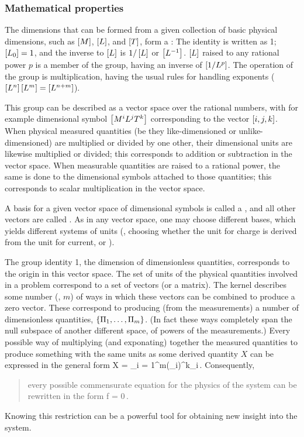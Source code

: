 \subsubsection{Mathematical properties}
The dimensions that can be formed from a given collection of basic physical dimensions, such as $\left[{M}\right]$, $\left[{L}\right]$, and $\left[{T}\right]$, form a : The identity is written as 1; $\left[{L_0}\right] = 1$, and the inverse to $\left[{L}\right]$ is $1/\left[{L}\right]$ or $\left[{L^{-1}}\right]$. $\left[{L}\right]$ raised to any rational power $p$ is a member of the group, having an inverse of $\left[{1/L^p}\right]$. The operation of the group is multiplication, having the usual rules for handling exponents ($\left[{L^n}\right]\left[{L^m}\right] = \left[{L^{n+m}}\right]$).

This group can be described as a vector space over the rational numbers, with for example dimensional symbol $\left[{M^iL^jT^k}\right]$ corresponding to the vector $\left[{i,j,k}\right]$. When physical measured quantities (be they like-dimensioned or unlike-dimensioned) are multiplied or divided by one other, their dimensional units are likewise multiplied or divided; this corresponds to addition or subtraction in the vector space. When measurable quantities are raised to a rational power, the same is done to the dimensional symbols attached to those quantities; this corresponds to scalar multiplication in the vector space.

A basis for a given vector space of dimensional symbols is called a , and all other vectors are called . As in any vector space, one may choose different bases, which yields different systems of units (\eg, choosing whether the unit for charge is derived from the unit for current, or \vis).

The group identity 1, the dimension of dimensionless quantities, corresponds to the origin in this vector space.
The set of units of the physical quantities involved in a problem correspond to a set of vectors (or a matrix). The kernel describes some number (\eg, $m$) of ways in which these vectors can be combined to produce a zero vector. These correspond to producing (from the measurements) a number of dimensionless quantities, $\left\lbrace{\Pi_1,\dotsc,\Pi_m}\right\rbrace$. (In fact these ways completely span the null subspace of another different space, of powers of the measurements.) Every possible way of multiplying (and exponating) together the measured quantities to produce something with the same units as some derived quantity $X$ can be expressed in the general form 
\beq
X = \prod_{i = 1}^{m}\left(\kdim_i\right)^{k_i}\,.
\eeq
Consequently, 
\begin{quote}
every possible commensurate equation for the physics of the system can be rewritten in the form 
\beq
f = 0\,.
\eeq 
\end{quote}
Knowing this restriction can be a powerful tool for obtaining new insight into the system.



